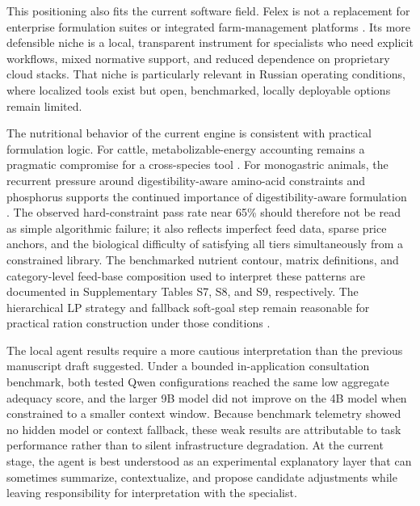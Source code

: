 \documentclass[a4paper,fleqn]{cas-dc}
\begin{document}
This positioning also fits the current software field. Felex is not a replacement for enterprise formulation suites or integrated farm-management platforms \citep{datacor2026, korall2026, onecow2026}. Its more defensible niche is a local, transparent instrument for specialists who need explicit workflows, mixed normative support, and reduced dependence on proprietary cloud stacks. That niche is particularly relevant in Russian operating conditions, where localized tools exist \citep{deltakorm2026, winmix2026} but open, benchmarked, locally deployable options remain limited.

The nutritional behavior of the current engine is consistent with practical formulation logic. For cattle, metabolizable-energy accounting remains a pragmatic compromise for a cross-species tool \citep{inra2018, volden2011, kalashnikov2003}. For monogastric animals, the recurrent pressure around digestibility-aware amino-acid constraints and phosphorus supports the continued importance of digestibility-aware formulation \citep{stein2007, nRC2012, pomar2021, deLange2012, vanmilgen2015}. The observed hard-constraint pass rate near 65\% should therefore not be read as simple algorithmic failure; it also reflects imperfect feed data, sparse price anchors, and the biological difficulty of satisfying all tiers simultaneously from a constrained library. The benchmarked nutrient contour, matrix definitions, and category-level feed-base composition used to interpret these patterns are documented in Supplementary Tables S7, S8, and S9, respectively. The hierarchical LP strategy and fallback soft-goal step remain reasonable for practical ration construction under those conditions \citep{rehman1987}.

The local agent results require a more cautious interpretation than the previous manuscript draft suggested. Under a bounded in-application consultation benchmark, both tested Qwen configurations reached the same low aggregate adequacy score, and the larger 9B model did not improve on the 4B model when constrained to a smaller context window. Because benchmark telemetry showed no hidden model or context fallback, these weak results are attributable to task performance rather than to silent infrastructure degradation. At the current stage, the agent is best understood as an experimental explanatory layer that can sometimes summarize, contextualize, and propose candidate adjustments while leaving responsibility for interpretation with the specialist.
\end{document}
